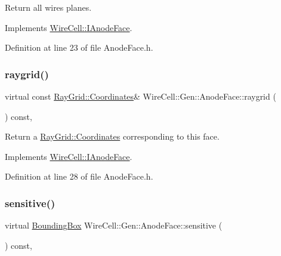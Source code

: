 Return all wires planes. 



Implements \hyperlink{class_wire_cell_1_1_i_anode_face_ae3ff56137d41a1ab6bf0dfa6892bd293}{Wire\+Cell\+::\+I\+Anode\+Face}.



Definition at line 23 of file Anode\+Face.\+h.

\mbox{\label{class_wire_cell_1_1_gen_1_1_anode_face_a1ee64f5c3c63f9d44907fd06d6bb6abe}} 
\subsubsection{\texorpdfstring{raygrid()}{raygrid()}}
{\footnotesize\ttfamily virtual const \hyperlink{class_wire_cell_1_1_ray_grid_1_1_coordinates}{Ray\+Grid\+::\+Coordinates}\& Wire\+Cell\+::\+Gen\+::\+Anode\+Face\+::raygrid (\begin{DoxyParamCaption}{ }\end{DoxyParamCaption}) const\hspace{0.3cm}{\ttfamily [inline]}, {\ttfamily [virtual]}}



Return a \hyperlink{class_wire_cell_1_1_ray_grid_1_1_coordinates}{Ray\+Grid\+::\+Coordinates} corresponding to this face. 



Implements \hyperlink{class_wire_cell_1_1_i_anode_face_a4f7bcaa754c5e72535d65568e9cb6c85}{Wire\+Cell\+::\+I\+Anode\+Face}.



Definition at line 28 of file Anode\+Face.\+h.

\mbox{\label{class_wire_cell_1_1_gen_1_1_anode_face_a8e9613ee708a9b68c939d135e425e488}} 
\subsubsection{\texorpdfstring{sensitive()}{sensitive()}}
{\footnotesize\ttfamily virtual \hyperlink{class_wire_cell_1_1_bounding_box}{Bounding\+Box} Wire\+Cell\+::\+Gen\+::\+Anode\+Face\+::sensitive (\begin{DoxyParamCaption}{ }\end{DoxyParamCaption}) const\hspace{0.3cm}{\ttfamily [inline]}, {\ttfamily [virtual]}}

